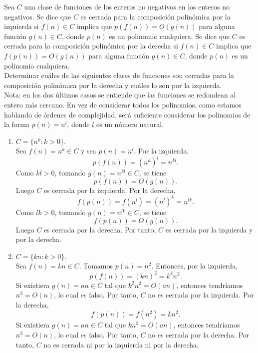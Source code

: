 \begin{ejercicio}
    Sea $C$ una clase de funciones de los enteros no negativos en los enteros no negativos. Se dice que $C$ es cerrada para la composición polinómica por la izquierda si $f(n) \in C$ implica que $p(f(n)) = O(g(n))$ para alguna función $g(n) \in C$, donde $p(n)$ es un polinomio cualquiera.
    Se dice que $C$ es cerrada para la composición polinómica por la derecha si $f(n) \in C$ implica que $f(p(n)) = O(g(n))$ para alguna función $g(n) \in C$, donde $p(n)$ es un polinomio cualquiera. \\

    \noindent Determinar cuáles de las siguientes clases de funciones son cerradas para la composición polinómica por la derecha y cuáles lo son por la izquierda. \\
    
    \noindent Nota: en los dos últimos casos se entiende que las funciones se redondean al 
    entero más cercano. En vez de considerar todos los polinomios, como estamos 
    hablando de órdenes de complejidad, será suficiente considerar los polinomios
    de la forma $p(n) = n^l$, donde $l$ es un número natural.

    \begin{enumerate}
        \item[(a)] $C=\{n^k:k>0\}$. \\

            Sea $f(n)=n^k \in C$ y sea $p(n)=n^l$. Por la izquierda,
            $$
            p(f(n))=(n^k)^l=n^{kl}.
            $$
            Como $kl > 0$, tomando $g(n)=n^{kl}\in C$, se tiene
            $$
            p(f(n))=O(g(n)).
            $$
            Luego $C$ es cerrada por la izquierda. Por la derecha,
            $$
            f(p(n))=f(n^l)=(n^l)^k=n^{lk}.
            $$
            Como $lk>0$, tomando $g(n)=n^{lk}\in C$, se tiene
            $$
            f(p(n))=O(g(n)).
            $$
            Luego $C$ es cerrada por la derecha. Por tanto, $C$ es cerrada por la izquierda y por la derecha.

        \item[(b)] $C=\{k n:k>0\}$. \\

            Sea $f(n)=kn\in C$. Tomamos $p(n)=n^2$. Entonces, por la izquierda,
            $$
            p(f(n))=(kn)^2=k^2n^2.
            $$
            Si existiera $g(n)=an\in C$ tal que $k^2n^2=O(an)$, entonces 
            tendríamos $n^2=O(n)$, lo cual es falso. Por tanto, $C$ no es 
            cerrada por la izquierda. Por la derecha,
            $$
            f(p(n))=f(n^2)=kn^2.
            $$
            Si existiera $g(n)=an\in C$ tal que $kn^2=O(an)$, entonces tendríamos $n^2=O(n)$, lo cual es falso. Por tanto, $C$ no es cerrada por la derecha.
            Por tanto, $C$ no es cerrada ni por la izquierda ni por la derecha.


\end{enumerate}
\end{ejercicio}
